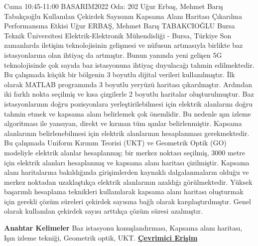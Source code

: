 
    \begin{abstract_basarim}
    {Cuma 10:45-11:00}
    {BASARIM2022}
    {Oda: 202}
    {Uğur Erbaş, Mehmet Barış Tabakçıoğlu}
    {Kullanılan Çekirdek Sayısının Kapsama Alanı Haritası Çıkarılma Performansına Etkisi}
    {%
    Uğur ERBAŞ, Mehmet Barış TABAKCIOĞLU}
    {%
    }
    {%
    Bursa Teknik Üniversitesi Elektrik-Elektronik Mühendisliği - Bursa, Türkiye}
    Son zamanlarda iletişim teknolojisinin gelişmesi ve nüfusun artmasıyla birlikte baz istasyonlarına olan ihtiyaç da artmıştır. Bunun yanında yeni gelişen 5G teknolojisinde çok sayıda baz istasyonuna ihtiyaç duyulacağı tahmin edilmektedir. Bu çalışmada küçük bir bölgenin 3 boyutlu dijital verileri kullanılmıştır. İlk olarak MATLAB programında 3 boyutlu yeryüzü haritası çıkarılmıştır. Ardından iki farklı nokta seçilmiş ve kısa çizgilerle 2 boyutlu haritalar oluşturulmuştur. Baz istasyonlarının doğru pozisyonlara yerleştirilebilmesi için elektrik alanlarını doğru tahmin etmek ve kapsama alanı belirlemek çok önemlidir. Bu nedenle ışın izleme algoritması ile yansıyan, direkt ve kırınan tüm ışınlar belirlenmiştir. Kapsama alanlarının belirlenebilmesi için elektrik alanlarının hesaplanması gerekmektedir. Bu çalışmada Uniform Kırınım Teorisi (UKT) ve Geometrik Optik (GO) modeliyle elektrik alanlar hesaplanmış; bir merkez noktası seçilmiş, 3000 metre için elektrik alanları hesaplanmış ve kapsama alanı haritası çizilmiştir. Kapsama alanı haritalarına bakıldığında girişimlerden kaynaklı dalgalanmaların olduğu ve merkez noktadan uzaklaştıkça elektrik alanlarının azaldığı görülmektedir. Yüksek başarımlı hesaplama teknikleri kullanılarak kapsama alanı haritası oluşturmak için gerekli çözüm süreleri çekirdek sayısına bağlı olarak karşılaştırılmıştır. Genel olarak kullanılan çekirdek sayısı arttıkça çözüm süresi azalmıştır. 
    
            \textbf{Anahtar Kelimeler} \newline{}Baz istasyonu konuşlandırması, Kapsama alanı haritası, Işın izleme tekniği, Geometrik optik, UKT.
     \newline\newline\noindent \href{https://drive.google.com/file/d/1FUUrT7ODU41jBmEDcWtKwz4KelsswDGY/view?usp=drivesdk}{\bfseries Çevrimici Erişim}
    \end{abstract_basarim}
    